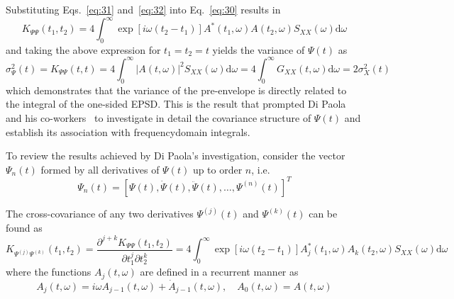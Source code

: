 \documentclass[12pt]{article}
\begin{document}
Substituting Eqs.~\eqref{eq:31} and~\eqref{eq:32} into Eq.~\eqref{eq:30} results in
\begin{equation}
K_{\Psi \Psi}\left(t_{1}, t_{2}\right)=4 \int_{0}^{\infty} \exp \left[i \omega\left(t_{2}-t_{1}\right)\right] A^{*}\left(t_{1}, \omega\right) A\left(t_{2}, \omega\right) S_{X X}(\omega) \mathrm{d} \omega
\label{eq:33}
\end{equation}
and taking the above expression for $t_{1}=t_{2}=t$ yields the variance of $\Psi(t)$ as
\begin{equation}
\sigma_{\Psi}^{2}(t)=K_{\Psi \Psi}(t, t)=4 \int_{0}^{\infty}|A(t, \omega)|^{2} S_{X X}(\omega) \mathrm{d} \omega=4 \int_{0}^{\infty} G_{X X}(t, \omega) \mathrm{d} \omega=2 \sigma_{X}^{2}(t)
\label{eq:34}
\end{equation}
which demonstrates that the variance of the pre-envelope is directly related to the integral of the one-sided EPSD. This is the result that prompted Di Paola and his co-workers~\cite{DiPaolaPetrucci1990,Muscolino1988,LutesSarkani1997} to investigate in detail the covariance structure of $\Psi(t)$ and establish its association with frequencydomain integrals.

To review the results achieved by Di Paola's investigation, consider the vector $\Psi_{n}(t)$ formed by all derivatives of $\Psi(t)$ up to order $n$, i.e.
\begin{equation}
\Psi_{n}(t)=\left[\Psi(t), \dot{\Psi}(t), \ddot{\Psi}(t), \ldots, \Psi^{(n)}(t)\right]^{T}
\label{eq:35}
\end{equation}

The cross-covariance of any two derivatives $\Psi^{(j)}(t)$ and $\Psi^{(k)}(t)$ can be found as
\begin{equation}
K_{\Psi^{(j)}\Psi^{(k)}}\left(t_{1}, t_{2}\right)=\frac{\partial^{j+k} K_{\Psi \Psi}\left(t_{1}, t_{2}\right)}{\partial t_{1}^{j} \partial t_{2}^{k}}=4 \int_{0}^{\infty} \exp \left[i \omega\left(t_{2}-t_{1}\right)\right] A_{j}^{*}\left(t_{1}, \omega\right) A_{k}\left(t_{2}, \omega\right) S_{X X}(\omega) \mathrm{d} \omega
\label{eq:36}
\end{equation}
where the functions $A_{j}(t, \omega)$ are defined in a recurrent manner as
\begin{equation}
A_{j}(t, \omega)=i \omega A_{j-1}(t,\omega)+\dot{A}_{j-1}(t, \omega), \quad A_{0}(t, \omega)=A(t, \omega)
\label{eq:37}
\end{equation}
\end{document}
